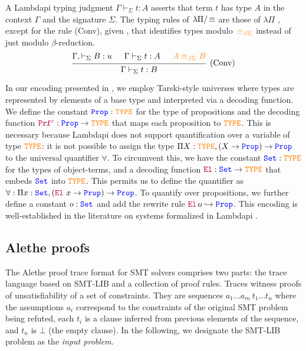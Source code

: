 A Lambdapi typing judgment $\Gamma \vdash_\Sigma t : A$ asserts that term $t$ has type $A$ in the context $\Gamma$ and the signature $\Sigma$.
The typing rules of $\lambda\Pi/\mathop{\equiv}$ are those of  $\lambda\Pi$ \cite[\S 2]{lf}, except for the rule (Conv), given , that identifies types modulo~$\textcolor{orange}{\equiv_{\beta\Sigma}}$ instead of just modulo $\beta$-reduction. 
\[
    \begin{prooftree}
    \hypo{\Gamma, \vdash_\Sigma B: u}
    \hypo{\Gamma \vdash_\Sigma t: A}
    \hypo{\textcolor{orange}{A \equiv_{\beta\Sigma} B}}
    \infer3[(Conv)]{ \Gamma \vdash_\Sigma t: B }
    \end{prooftree}
\]

In our encoding presented in \cite{ColtellacciMD24},  we employ Tarski-style universes \cite{intuitype} where types are represented by elements of a base type and interpreted via a decoding function.
We define the constant $\textcolor{blue}{\texttt{\upshape{Prop}}}: \textcolor{orange}{\texttt{\upshape{TYPE}}}$ for the type of propositions and the decoding function $\textcolor{purple}{\texttt{\upshape{Prf}}^c}: \textcolor{blue}{\texttt{\upshape{Prop}}} \rightarrow \textcolor{orange}{\texttt{\upshape{TYPE}}}$ that maps each proposition to $\textcolor{orange}{\texttt{\upshape{TYPE}}}$. This is necessary because Lambdapi does not support quantification over a variable of type $\textcolor{orange}{\texttt{\upshape{TYPE}}}$: it is not possible to assign the type $\Pi X : \textcolor{orange}{\texttt{\upshape{TYPE}}},(X \rightarrow \textcolor{blue}{\texttt{\upshape{Prop}}}) \rightarrow \textcolor{blue}{\texttt{\upshape{Prop}}}$ to the universal quantifier $\forall$.
To circumvent this, we have the constant $\textcolor{blue}{\texttt{\upshape{Set}}} : \textcolor{orange}{\texttt{\upshape{TYPE}}}$ for the types of object-terms, and a decoding function ${\textcolor{purple}{\mathop{\texttt{\upshape{El}}}}}: \textcolor{blue}{\texttt{\upshape{Set}}} \rightarrow \textcolor{orange}{\texttt{\upshape{TYPE}}}$ that embeds $\textcolor{blue}{\texttt{\upshape{Set}}}$ into $\textcolor{orange}{\texttt{\upshape{TYPE}}}$.
This permits us to define the  quantifier as $\forall: \Pi x: \textcolor{blue}{\texttt{\upshape{Set}}}, (\textcolor{purple}{\mathop{\texttt{\upshape{El}}}}~x \rightarrow \textcolor{blue}{\texttt{\upshape{Prop}}}) \rightarrow \textcolor{blue}{\texttt{\upshape{Prop}}}$.
To quantify over propositions, we further define a constant $o: \textcolor{blue}{\texttt{\upshape{Set}}}$ and add the rewrite rule  $\textcolor{purple}{\mathop{\texttt{\upshape{El}}}}\, o \hookrightarrow \textcolor{blue}{\texttt{\upshape{Prop}}}$.
This encoding is well-established in the literature on systems formalized in Lambdapi \cite{blanqui_et_al:LIPIcs.FSCD.2021.20}. 

\subsection{Alethe proofs}
\label{ssect:alethe}

The Alethe proof trace format \cite{alethespec} for SMT solvers comprises two parts: the trace language based on SMT-LIB and a collection of proof rules. Traces witness proofs of unsatisfiability of a set of constraints.
They are sequences $a_1 \dots a_m~t_1 \dots t_n$ where the assumptions $a_i$ correspond to the constraints of the original SMT problem being refuted, each $t_i$ is a clause inferred from previous elements of the sequence, and $t_n$ is $\bot$ (the empty clause).
In the following, we designate the SMT-LIB problem as the \emph{input problem}.

